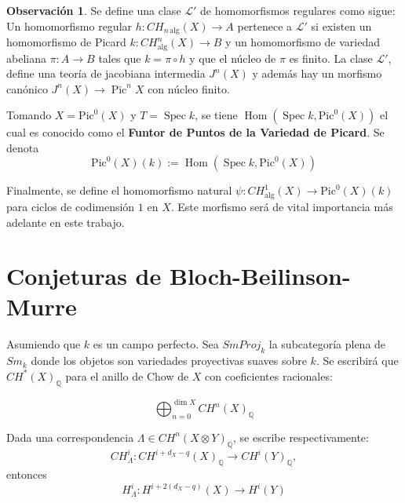 \documentclass[10pt]{amsart}
\theoremstyle{definition}
\newtheorem{obs}[definition]{Observaci\'on}
\theoremstyle{remark}
\theoremstyle{definition}
\newcommand{\spec}{\operatorname{Spec}}
\begin{document}
\begin{obs} 
Se define una clase \(\mathcal{L}'\) de homomorfismos regulares como sigue: Un homomorfismo regular \(h: CH_{n\,\mathrm{alg}}(X) \to A\) pertenece a \(\mathcal{L}'\) si existen un homomorfismo de Picard \(k: CH_{\mathrm{alg}}^n(X) \to B\) y un homomorfismo de variedad abeliana \(\pi: A \to B\) tales que \(k = \pi \circ h\) y que el núcleo de \(\pi\) es finito. La clase \(\mathcal{L}'\),  define una teoría de jacobiana intermedia \(J^n(X)\) y además hay un morfismo canónico \(J^n(X) \to \operatorname{Pic}^n X\) con núcleo finito. 
\end{obs}


Tomando $X={\mathrm{Pic}^{0}}(X)$ y $T=\spec{\mathit{k}}$, se tiene $\operatorname{Hom}(\operatorname{Spec}{\mathit{k}},\mathrm{Pic}^{0}(X))$ el cual es conocido como el \textbf{Funtor de Puntos de la Variedad de Picard}. Se denota 
\begin{equation*}
\mathrm{Pic}^{0}(X)(k):=\operatorname{Hom}(\operatorname{Spec}{\mathit{k}},{\mathrm{Pic}}^{0}(X))
\end{equation*}


Finalmente, se define el homomorfismo natural \(\psi:CH^{1}_{\mathrm{alg}}(X)\to\mathrm{Pic}^{0}(X)(k)\) para ciclos de codimensión \(1\) en \(X\). Este morfismo será de vital importancia más adelante en este trabajo.
\section{Conjeturas de Bloch-Beilinson-Murre}


Asumiendo que $\mathit{k}$ es un campo perfecto. Sea $SmProj_{\mathit{k}}$ la subcategor\'ia plena de $Sm_{\mathit{k}}$ donde los objetos son variedades proyectivas suaves sobre $\mathit{k}$. Se escribir\'a que $CH^{*}(X)_{\mathbb{Q}}$ para el anillo de Chow de $X$ con coeficientes racionales:

 \begin{equation*}
\bigoplus^{\dim X}_{n=0} CH^n(X)_{\mathbb{Q}}
\end{equation*}

Dada una correspondencia $\Lambda \in CH^{n}(X \otimes Y)_{\mathbb{Q}}$, se escribe respectivamente:
\begin{equation*}
CH^{i}_{\Lambda}:CH^{i+d_{X}-q}(X)_{\mathbb{Q}} \rightarrow CH^{i}(Y)_{\mathbb{Q}},
\end{equation*}
entonces
\begin{equation*}
H^{i}_{\Lambda}:H^{i+2(d_{X}-q)}(X) \rightarrow H^{i}(Y)
\end{equation*}
\end{document}
